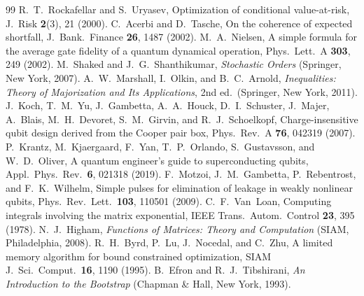 \documentclass[aps,pra,onecolumn,notitlepage,superscriptaddress,nofootinbib,floatfix]{revtex4-2}
\begin{document}
\begin{thebibliography}{99}
 R.~T.~Rockafellar and S.~Uryasev, Optimization of conditional value-at-risk, J.\ Risk \textbf{2}(3), 21 (2000).
 C.~Acerbi and D.~Tasche, On the coherence of expected shortfall, J.\ Bank.\ Finance \textbf{26}, 1487 (2002).
 M.~A.~Nielsen, A simple formula for the average gate fidelity of a quantum dynamical operation, Phys.\ Lett.\ A \textbf{303}, 249 (2002).
 M.~Shaked and J.~G.~Shanthikumar, \emph{Stochastic Orders} (Springer, New York, 2007).
 A.~W.~Marshall, I.~Olkin, and B.~C.~Arnold, \emph{Inequalities: Theory of Majorization and Its Applications}, 2nd ed.\ (Springer, New York, 2011).
 J.~Koch, T.~M.~Yu, J.~Gambetta, A.~A.~Houck, D.~I.~Schuster, J.~Majer, A.~Blais, M.~H.~Devoret, S.~M.~Girvin, and R.~J.~Schoelkopf, Charge-insensitive qubit design derived from the Cooper pair box, Phys.\ Rev.\ A \textbf{76}, 042319 (2007).
 P.~Krantz, M.~Kjaergaard, F.~Yan, T.~P.~Orlando, S.~Gustavsson, and W.~D.~Oliver, A quantum engineer's guide to superconducting qubits, Appl.\ Phys.\ Rev.\ \textbf{6}, 021318 (2019).
 F.~Motzoi, J.~M.~Gambetta, P.~Rebentrost, and F.~K.~Wilhelm, Simple pulses for elimination of leakage in weakly nonlinear qubits, Phys.\ Rev.\ Lett.\ \textbf{103}, 110501 (2009).
 C.~F.~Van~Loan, Computing integrals involving the matrix exponential, IEEE Trans.\ Autom.\ Control \textbf{23}, 395 (1978).
 N.~J.~Higham, \emph{Functions of Matrices: Theory and Computation} (SIAM, Philadelphia, 2008).
 R.~H.~Byrd, P.~Lu, J.~Nocedal, and C.~Zhu, A limited memory algorithm for bound constrained optimization, SIAM J.\ Sci.\ Comput.\ \textbf{16}, 1190 (1995).
 B.~Efron and R.~J.~Tibshirani, \emph{An Introduction to the Bootstrap} (Chapman \& Hall, New York, 1993).
\end{thebibliography}
\end{document}
